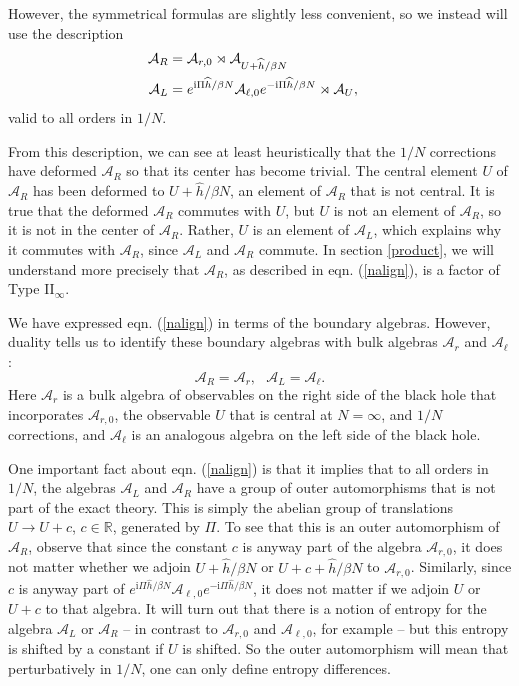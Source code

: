 \documentclass[11pt,a4paper]{article}
\def\i{{\mathrm i}}
\def\be{\begin{equation}}
\def\ee{\end{equation}}
\def\h{\widehat}
\def\A{{\mathcal A}}
\def\R{{\mathbb R}}
\def\U{{ U}}
\def\h{\widehat}
\begin{document}
 However, the symmetrical formulas are slightly less convenient, so we instead will use the description
 \begin{align}\label{nalign} \A_R& =\A_{r,0} \rtimes \A_{\U+\h h/\beta N} \cr
                      \A_L&=e^{\i\Pi \h h/\beta N} \A_{\ell,0} e^{-\i \Pi \h h/\beta N}\rtimes \A_\U, \end{align}
  valid to all orders in $1/N$. 
  
  From this description, we can see at least heuristically 
  that the $1/N$ corrections have deformed $\A_R$ so that its center has become trivial.   The central element $\U$ of $\A_R$ has been deformed to 
  $\U+\h h/\beta N$, an element of  $\A_R$ that is not central.   It is true that the deformed $\A_R$ commutes with $\U$, but $\U$ is not an element of $\A_R$,
  so it is not in the center of $\A_R$.  Rather, $\U$ is an element of $\A_L$, which explains why it commutes with $\A_R$, since $\A_L$ and $\A_R$ commute.
  In section \ref{product}, we will understand more precisely that $\A_R$, as described in eqn. (\ref{nalign}), is a factor of Type II$_\infty$.   
  
  We have expressed eqn. (\ref{nalign})  in terms of the boundary algebras.   However, duality tells us to identify these boundary algebras with bulk algebras
  $\A_r$ and $\A_\ell$:
  \be\label{duality} \A_R=\A_r,~~~\A_L=\A_\ell. \ee
  Here $\A_r$ is a bulk algebra of observables on the right side of the black hole
  that incorporates $\A_{r,0}$, the observable $\U$ that is central at $N=\infty$, and $1/N$ corrections, and 
  $\A_\ell$ is an analogous algebra on the left side of the black hole.
  
  One important fact about eqn. (\ref{nalign}) is that it implies that to all orders in $1/N$, the algebras $\A_L$ and $\A_R$ have a group of outer automorphisms
  that is not part of the exact theory.    This is simply the abelian group of translations $U\to U+c$, $c\in \R$, generated by $\Pi$.   To see that this is
  an outer automorphism of $\A_R$, observe that since the constant $c$ is anyway part of the algebra $\A_{r,0}$, it does not matter whether we adjoin
  $\U+\h h/\beta N$ or $\U+c+ \h h/\beta N$ to $\A_{r,0}$.   Similarly, since $c$ is anyway part of $e^{\i\Pi \h h/\beta N} \A_{\ell,0} e^{-\i \Pi \h h/\beta N}$,
  it does not matter if we adjoin $\U$ or $\U+c$ to that algebra.   It will turn out that there is a notion of entropy for the algebra $\A_L$ or $\A_R$ -- in contrast to
  $\A_{r,0}$ and $\A_{\ell,0}$, for example --  but this
  entropy is shifted by a constant if $\U$ is shifted.   So the outer automorphism will mean that perturbatively in $1/N$, one can only define entropy differences.
 
\end{document}
